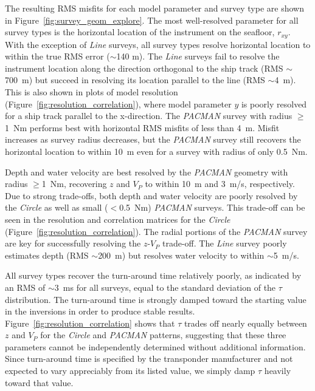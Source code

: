The resulting RMS misfits for each model parameter and survey type are shown in Figure~\ref{fig:survey_geom_explore}. The most well-resolved parameter for all survey types is the horizontal location of the instrument on the seafloor, $r_{xy}$. With the exception of \textit{Line} surveys, all survey types resolve horizontal location to within the true RMS error ($\sim$140 m). The \textit{Line} surveys fail to resolve the instrument location along the direction orthogonal to the ship track (RMS $\sim$700~m) but succeed in resolving its location parallel to the line (RMS $\sim$4~m). This is also shown in plots of model resolution (Figure~\ref{fig:resolution_correlation}), where model parameter $y$ is poorly resolved for a ship track parallel to the x-direction. The \textit{PACMAN} survey with radius $\geq$1~Nm performs best with horizontal RMS misfits of less than 4~m. Misfit increases as survey radius decreases, but the \textit{PACMAN} survey still recovers the horizontal location to within 10~m even for a survey with radius of only 0.5~Nm.

Depth and water velocity are best resolved by the \textit{PACMAN} geometry with radius $\geq$1~Nm, recovering $z$ and $V_{P}$ to within 10~m and 3~m/s, respectively. Due to strong trade-offs, both depth and water velocity are poorly resolved by the \textit{Circle} as well as small ($<$0.5~Nm) \textit{PACMAN} surveys. This trade-off can be seen in the resolution and correlation matrices for the \textit{Circle} (Figure~\ref{fig:resolution_correlation}). The radial portions of the \textit{PACMAN} survey are key for successfully resolving the $z$-$V_P$ trade-off. The \textit{Line} survey poorly estimates depth (RMS $\sim$200~m) but resolves water velocity to within $\sim$5~m/s.

All survey types recover the turn-around time relatively poorly, as indicated by an RMS of $\sim$3~ms for all surveys, equal to the standard deviation of the $\tau$ distribution. The turn-around time is strongly damped toward the starting value in the inversions in order to produce stable results. Figure~\ref{fig:resolution_correlation} shows that $\tau$ trades off nearly equally between $z$ and $V_{P}$ for the \textit{Circle} and \textit{PACMAN} patterns, suggesting that these three parameters cannot be independently determined without additional information. Since turn-around time is specified by the transponder manufacturer and not expected to vary appreciably from its listed value, we simply damp $\tau$ heavily toward that value.

